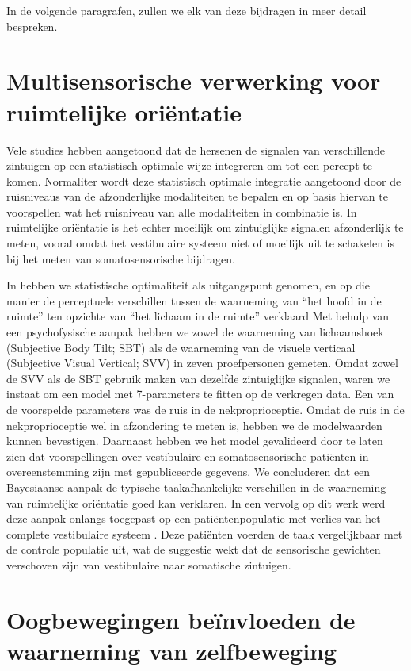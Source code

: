 In de volgende paragrafen, zullen we elk van deze bijdragen in meer detail bespreken.

\section{Multisensorische verwerking voor ruimtelijke ori\"entatie}

Vele studies hebben aangetoond dat de hersenen de signalen van verschillende zintuigen op een statistisch optimale wijze integreren om tot een percept te komen. Normaliter wordt deze statistisch optimale integratie aangetoond door de ruisniveaus van de afzonderlijke modaliteiten te bepalen en op basis hiervan te voorspellen wat het ruisniveau van alle modaliteiten in combinatie is. In ruimtelijke ori\"entatie is het echter moeilijk om zintuiglijke signalen afzonderlijk te meten, vooral omdat het vestibulaire systeem niet of moeilijk uit te schakelen is bij het meten van somatosensorische bijdragen.

In  hebben we statistische optimaliteit als uitgangspunt genomen, en op die manier de perceptuele verschillen tussen de waarneming van “het hoofd in de ruimte” ten opzichte van “het lichaam in de ruimte” verklaard Met behulp van een psychofysische aanpak hebben we zowel de waarneming van lichaamshoek (Subjective Body Tilt; SBT) als de waarneming van de visuele verticaal (Subjective Visual Vertical; SVV) in zeven proefpersonen gemeten. Omdat zowel de SVV als de SBT gebruik maken van dezelfde zintuiglijke signalen, waren we instaat om een model met 7-parameters te fitten op de verkregen data. Een van de voorspelde parameters was de ruis in de nekproprioceptie. Omdat de ruis in de nekproprioceptie wel in afzondering te meten is, hebben we de modelwaarden kunnen bevestigen. Daarnaast hebben we het model gevalideerd door te laten zien dat voorspellingen over vestibulaire en somatosensorische pati\"enten in overeenstemming zijn met gepubliceerde gegevens. We concluderen dat een Bayesiaanse aanpak de typische taakafhankelijke verschillen in de waarneming van ruimtelijke ori\"entatie goed kan verklaren. In een vervolg op dit werk werd deze aanpak onlangs toegepast op een pati\"entenpopulatie met verlies van het complete vestibulaire systeem \cite{alberts2015}. Deze pati\"enten voerden de taak vergelijkbaar met de controle populatie uit, wat de suggestie wekt dat de sensorische gewichten verschoven zijn van vestibulaire naar somatische zintuigen.


\section{Oogbewegingen beïnvloeden de waarneming van zelfbeweging}

